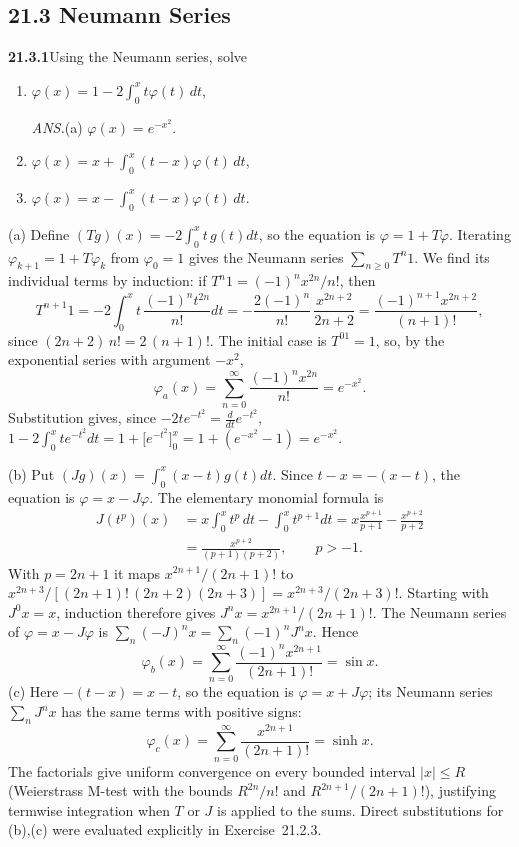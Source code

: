 \subsection*{21.3 Neumann Series}

\par\bigskip
\noindent\textbf{21.3.1}\quad Using the Neumann series, solve
\begin{enumerate}
\item[(a)] $\varphi(x)=1-2\displaystyle\int_{0}^{x}
t\varphi(t)\,dt$,
\par\nobreak\hfill\emph{ANS.}\enspace(a) $\varphi(x)=e^{-x^{2}}$.
\item[(b)] $\varphi(x)=x+\displaystyle\int_{0}^{x}
(t-x)\varphi(t)\,dt$,
\item[(c)] $\varphi(x)=x-\displaystyle\int_{0}^{x}
(t-x)\varphi(t)\,dt$.
\end{enumerate}
\solution
(a) Define $(Tg)(x)=-2\int_0^x t\,g(t)dt$, so the equation is
$\varphi=1+T\varphi$. Iterating $\varphi_{k+1}=1+T\varphi_k$ from
$\varphi_0=1$ gives the Neumann series $\sum_{n\ge0}T^n1$.
We find its individual terms by induction:
if $T^n1=(-1)^nx^{2n}/n!$, then
\[
T^{n+1}1=-2\int_0^x t\,\frac{(-1)^nt^{2n}}{n!}dt
=-\frac{2(-1)^n}{n!}\,\frac{x^{2n+2}}{2n+2}
=\frac{(-1)^{n+1}x^{2n+2}}{(n+1)!},
\]
since $(2n+2)\,n!=2\,(n+1)!$.
The initial case is $T^01=1$, so, by the exponential series with
argument $-x^2$,
\[
\boxed{\varphi_a(x)=\sum_{n=0}^\infty
\frac{(-1)^nx^{2n}}{n!}=e^{-x^2}}.
\]
Substitution gives, since $-2te^{-t^2}=\frac{d}{dt}e^{-t^2}$,
$1-2\int_0^xt e^{-t^2}dt=1+\bigl[e^{-t^2}\bigr]_0^x
=1+(e^{-x^2}-1)=e^{-x^2}$.

(b) Put $(Jg)(x)=\int_0^x(x-t)g(t)dt$. Since $t-x=-(x-t)$, the
equation is $\varphi=x-J\varphi$. The elementary monomial formula is
\[
\begin{aligned}
J(t^p)(x)&=x\int_0^xt^p\,dt-\int_0^xt^{p+1}dt
=x\frac{x^{p+1}}{p+1}-\frac{x^{p+2}}{p+2}\\
&=\frac{x^{p+2}}{(p+1)(p+2)},\qquad p>-1.
\end{aligned}
\]
With $p=2n+1$ it maps $x^{2n+1}/(2n+1)!$ to
$x^{2n+3}/[(2n+1)!\,(2n+2)(2n+3)]=x^{2n+3}/(2n+3)!$. Starting with
$J^0x=x$, induction therefore gives $J^nx=x^{2n+1}/(2n+1)!$.
The Neumann series of $\varphi=x-J\varphi$ is
$\sum_n(-J)^nx=\sum_n(-1)^nJ^nx$. Hence
\[
\boxed{\varphi_b(x)=\sum_{n=0}^\infty
\frac{(-1)^nx^{2n+1}}{(2n+1)!}=\sin x}.
\]
(c) Here $-(t-x)=x-t$, so the equation is $\varphi=x+J\varphi$; its
Neumann series $\sum_nJ^nx$ has the same terms with positive signs:
\[
\boxed{\varphi_c(x)=\sum_{n=0}^\infty
\frac{x^{2n+1}}{(2n+1)!}=\sinh x}.
\]
The factorials give uniform convergence on every bounded interval
$|x|\le R$ (Weierstrass M-test with the bounds $R^{2n}/n!$ and
$R^{2n+1}/(2n+1)!$), justifying termwise integration when $T$ or $J$ is
applied to the sums. Direct substitutions for (b),(c) were
evaluated explicitly in Exercise~21.2.3.


